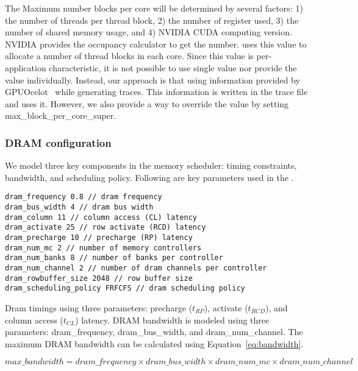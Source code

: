The Maximum number blocks per core will be determined by several
factors: 1) the number of threads per thread block, 2) the number of
register used, 3) the number of shared memory usage, and 4) NVIDIA
CUDA computing version. NVIDIA provides the occupancy calculator to
get the number. \SIM uses this value to allocate a number of thread
blocks in each core. Since this value is per-application
characteristic, it is not possible to use single value nor provide the
value individually. Instead, our approach is that using information
provided by GPUOcelot~\cite{ocelot} while generating traces. This
information is written in the trace file and \SIM uses it. However, we
also provide a way to override the value by
setting \textsf{max\_block\_per\_core\_super}.



\subsubsection{DRAM configuration}
\label{sec:param-dram}

We model three key components in the memory scheduler: timing
constraints, bandwidth, and scheduling policy. Following are key
parameters used in the \SIM.


\smallskip
\begin{lstlisting}
dram_frequency 0.8 // dram frequency
dram_bus_width 4 // dram bus width
dram_column 11 // column access (CL) latency
dram_activate 25 // row activate (RCD) latency
dram_precharge 10 // precharge (RP) latency
dram_num_mc 2 // number of memory controllers
dram_num_banks 8 // number of banks per controller
dram_num_channel 2 // number of dram channels per controller
dram_rowbuffer_size 2048 // row buffer size
dram_scheduling_policy FRFCFS // dram scheduling policy
\end{lstlisting}
\smallskip

Dram timings using three parameters: precharge ($t_{RP}$), activate
($t_{RCD}$), and column access ($t_{CL}$) latency. DRAM bandwidth is
modeled using three
parameters: \textsf{dram\_frequency}, \textsf{dram\_bus\_width},
and \textsf{dram\_num\_channel}. The maximum DRAM bandwidth can be
calculated using Equation~\ref{eq:bandwidth}.

\begin{equation}
\label{eq:bandwidth}
max\_bandwidth = dram\_frequency \times dram\_bus\_width \times dram\_num\_mc \times dram\_num\_channel 
\end{equation}

